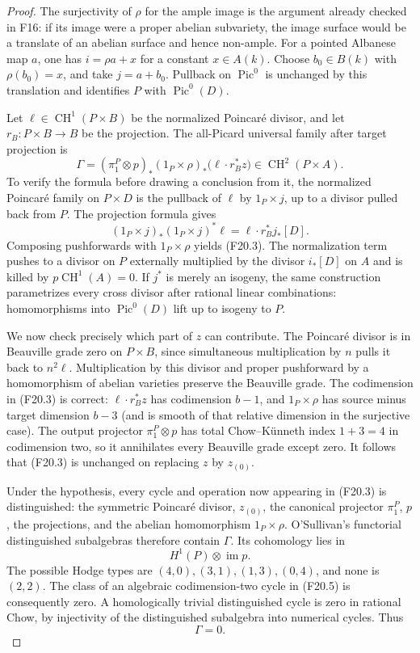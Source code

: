 \documentclass[11pt]{article}
\theoremstyle{remark}\newtheorem{remark}[theorem]{Remark}
\begin{document}
\begin{proof}
The surjectivity of $\rho$ for the ample image is the
argument already checked in F16: if its image were a
proper abelian subvariety, the image surface would be
a translate of an abelian surface and hence non-ample.
For a pointed Albanese map $a$, one has
$i=\rho a+x$ for a constant $x\in A(k)$.  Choose
$b_0\in B(k)$ with $\rho(b_0)=x$, and take
$j=a+b_0$.  Pullback on $\operatorname{Pic}^0$ is unchanged
by this translation and identifies $P$ with
$\operatorname{Pic}^0(D)$.

Let $\ell\in\operatorname{CH}^1(P\times B)$ be the
normalized Poincar\'e divisor, and let $r_B:P\times B\to B$
be the projection.  The all-Picard universal family
after target projection is
\[
 \Gamma=(\pi_1^P\otimes p)_*
     (1_P\times\rho)_*\bigl(\ell\cdot r_B^*z\bigr)
                       \in\operatorname{CH}^2(P\times A).
 \tag{F20.3}
\]
To verify the formula before drawing a conclusion from
it, the normalized Poincar\'e family on $P\times D$
is the pullback of $\ell$ by $1_P\times j$, up to a
divisor pulled back from $P$.  The projection formula
gives
\[
 (1_P\times j)_*(1_P\times j)^*\ell
                            =\ell\cdot r_B^*j_*[D].
 \tag{F20.4}
\]
Composing pushforwards with $1_P\times\rho$ yields
(F20.3).  The normalization term pushes to a divisor
on $P$ externally multiplied by the divisor $i_*[D]$
on $A$ and is killed by $p\operatorname{CH}^1(A)=0$.
If $j^*$ is merely an isogeny, the same construction
parametrizes every cross divisor after rational
linear combinations: homomorphisms into
$\operatorname{Pic}^0(D)$ lift up to isogeny to $P$.

We now check precisely which part of $z$ can contribute.
The Poincar\'e divisor is in Beauville grade zero on
$P\times B$, since simultaneous multiplication by $n$
pulls it back to $n^2\ell$.  Multiplication by this
divisor and proper pushforward by a homomorphism of
abelian varieties preserve the Beauville grade.
The codimension in (F20.3) is correct:
$\ell\cdot r_B^*z$ has codimension $b-1$, and
$1_P\times\rho$ has source minus target dimension
$b-3$ (and is smooth of that relative dimension in
the surjective case).
The output projector $\pi_1^P\otimes p$ has total
Chow--K\"unneth index $1+3=4$ in codimension two,
so it annihilates every Beauville grade except zero.
It follows that (F20.3) is unchanged on replacing
$z$ by $z_{(0)}$.

Under the hypothesis, every cycle and operation now
appearing in (F20.3) is distinguished: the symmetric
Poincar\'e divisor, $z_{(0)}$, the canonical projector
$\pi_1^P$, $p$, the projections, and the abelian
homomorphism $1_P\times\rho$.
O'Sullivan's functorial distinguished subalgebras
therefore contain $\Gamma$.  Its cohomology lies in
\[
                            H^1(P)\otimes\operatorname{im}p.
 \tag{F20.5}
\]
The possible Hodge types are $(4,0),(3,1),(1,3),(0,4)$,
and none is $(2,2)$.  The class of an algebraic
codimension-two cycle in (F20.5) is consequently zero.
A homologically trivial distinguished cycle is zero
in rational Chow, by injectivity of the distinguished
subalgebra into numerical cycles.  Thus
\[
                                  \Gamma=0.
 \tag{F20.6}
\]


\end{proof}
\end{document}

